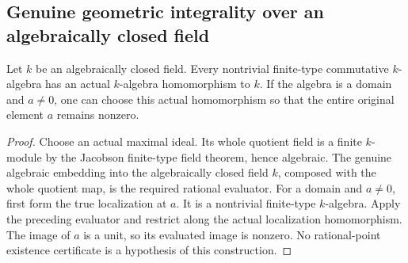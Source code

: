 \subsection{Genuine geometric integrality over an algebraically closed field}
\label{subsec:geometric-domain-base-change}

\begin{theorem}
\label{algebra:rational-specialization-nonzero}
\leanok
Let $k$ be an algebraically closed field. Every nontrivial finite-type
commutative $k$-algebra has an actual $k$-algebra homomorphism to $k$.
If the algebra is a domain and $a\ne0$, one can choose this actual
homomorphism so that the entire original element $a$ remains nonzero.
\end{theorem}
\begin{proof}
Choose an actual maximal ideal. Its whole quotient field is a finite
$k$-module by the Jacobson finite-type field theorem, hence algebraic.
The genuine algebraic embedding into the algebraically closed field $k$,
composed with the whole quotient map, is the required rational evaluator.
For a domain and $a\ne0$, first form the true localization at $a$.
It is a nontrivial finite-type $k$-algebra. Apply the preceding evaluator
and restrict along the actual localization homomorphism. The image of
$a$ is a unit, so its evaluated image is nonzero. No rational-point
existence certificate is a hypothesis of this construction.
\end{proof}

